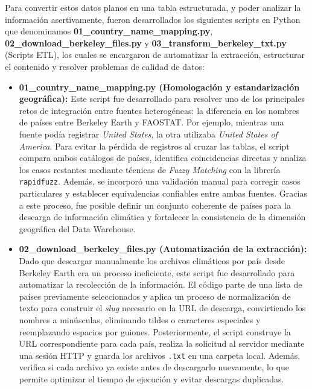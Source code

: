 Para convertir estos datos planos en una tabla estructurada, y poder analizar la información asertivamente, fueron desarrollados los siguientes scripts en Python que denominamos \textbf{01\_country\_name\_mapping.py}, \textbf{02\_download\_berkeley\_files.py} y \textbf{03\_transform\_berkeley\_txt.py} (Scripts ETL), los cuales se encargaron de automatizar la extracción, estructurar el contenido y resolver problemas de calidad de datos:
\begin{itemize}
	\item \textbf{01\_country\_name\_mapping.py (Homologación y estandarización geográfica): }
	Este script fue desarrollado para resolver uno de los principales retos de integración entre fuentes heterogéneas: la diferencia en los nombres de países entre Berkeley Earth y FAOSTAT. Por ejemplo, mientras una fuente podía registrar \textit{United States}, la otra utilizaba \textit{United States of America}. Para evitar la pérdida de registros al cruzar las tablas, el script compara ambos catálogos de países, identifica coincidencias directas y analiza los casos restantes mediante técnicas de \textit{Fuzzy Matching} con la librería \texttt{rapidfuzz}. Además, se incorporó una validación manual para corregir casos particulares y establecer equivalencias confiables entre ambas fuentes. Gracias a este proceso, fue posible definir un conjunto coherente de países para la descarga de información climática y fortalecer la consistencia de la dimensión geográfica del Data Warehouse. 
	
	\item \textbf{02\_download\_berkeley\_files.py (Automatización de la extracción): }
	Dado que descargar manualmente los archivos climáticos por país desde Berkeley Earth era un proceso ineficiente, este script fue desarrollado para automatizar la recolección de la información. El código parte de una lista de países previamente seleccionados y aplica un proceso de normalización de texto para construir el \textit{slug} necesario en la URL de descarga, convirtiendo los nombres a minúsculas, eliminando tildes o caracteres especiales y reemplazando espacios por guiones. Posteriormente, el script construye la URL correspondiente para cada país, realiza la solicitud al servidor mediante una sesión HTTP y guarda los archivos \texttt{.txt} en una carpeta local. Además, verifica si cada archivo ya existe antes de descargarlo nuevamente, lo que permite optimizar el tiempo de ejecución y evitar descargas duplicadas.
	

\end{itemize}
